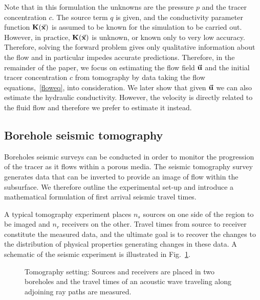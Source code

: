 \documentclass[english]{siamltex}
\newcommand {\bfK}  { {\bf K} }
\newcommand {\vu}  { {\vec {\bf  u}} }   %
\newcommand {\vx}    {\vec {\bf x}}
\renewcommand{\div}{\nabla\cdot\,}
\renewcommand{\grad}{\ensuremath {{\bf{ \nabla}}}}
\begin{document}

Note that in this formulation the unknowns are the  pressure $p$ and the tracer concentration $c$.
The source term $q$ is given, and the conductivity parameter function  $\bfK(\vx)$ is assumed to be known 
for the simulation to be carried out. 
However, in practice,  $\bfK(\vx)$ is unknown, or known only to very low accuracy. Therefore, solving the forward problem gives only qualitative information about the flow and in particular impedes accurate predictions.
  Therefore, in the remainder of the paper, we focus on estimating 
  the flow field $\vu$ and the initial tracer concentration $c$ from tomography by data taking the flow equations,~\eqref{floweq}, into consideration.
  We later show that given $\vu$ we can also estimate the hydraulic conductivity. However, the velocity is directly related to the fluid flow and therefore we prefer to estimate it instead.

 
\subsection{Borehole seismic tomography} %
\label{sub:geophysical_imaging}
Boreholes seismic surveys can be conducted in order to monitor the progression of the tracer as it flows within a porous media. 
The seismic tomography survey generates 
data that can be inverted to provide an image of flow within the subsurface. 
We therefore outline the experimental set-up and introduce a mathematical 
formulation of first arrival seismic travel times.   



A typical tomography experiment places $n_s$ sources on one side of the region to be imaged 
 and $n_r$ receivers on the other. Travel times from source to receiver constitute the 
measured data, and the ultimate goal is to recover the changes to the distribution of physical properties 
generating changes in these data. A schematic of the  seismic experiment is illustrated in Fig.~\ref{figTomo}. 
\begin{figure}[t]
\begin{center}
	
\caption{Tomography setting: Sources and receivers are placed in two boreholes and the travel times of an acoustic wave traveling along adjoining ray paths are measured.
\label{figTomo} }
\end{center}
\end{figure}
\end{document}
